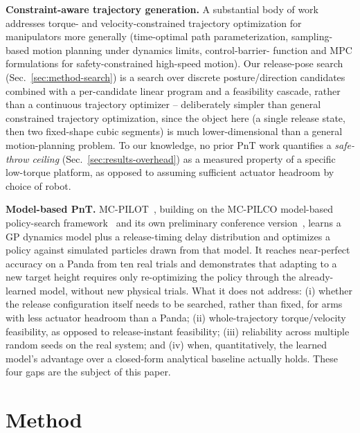 \documentclass[conference]{IEEEtran}
\begin{document}
\textbf{Constraint-aware trajectory generation.} A substantial body of
work addresses torque- and velocity-constrained trajectory optimization
for manipulators more generally (time-optimal path parameterization,
sampling-based motion planning under dynamics limits, control-barrier-
function and MPC formulations for safety-constrained high-speed motion).
Our release-pose search (Sec.~\ref{sec:method-search}) is a search over
discrete posture/direction candidates combined with a per-candidate linear
program and a feasibility cascade, rather than a continuous trajectory
optimizer -- deliberately simpler than general constrained trajectory
optimization, since the object here (a single release state, then two
fixed-shape cubic segments) is much lower-dimensional than a general
motion-planning problem. To our knowledge, no prior PnT work quantifies a
\emph{safe-throw ceiling} (Sec.~\ref{sec:results-overhead}) as a measured
property of a specific low-torque platform, as opposed to assuming
sufficient actuator headroom by choice of robot.

\textbf{Model-based PnT.} MC-PILOT~\cite{turcato2025mcpilot}, building on
the MC-PILCO model-based policy-search framework~\cite{amadio2022mcpilco}
and its own preliminary conference version~\cite{turcato2023codit}, learns
a GP dynamics model plus a release-timing delay distribution and optimizes
a policy against simulated particles drawn from that model. It reaches
near-perfect accuracy on a Panda from ten real trials and demonstrates that
adapting to a new target height requires only re-optimizing the policy
through the already-learned model, without new physical trials. What it
does not address: (i) whether the release configuration itself needs to be
searched, rather than fixed, for arms with less actuator headroom than a
Panda; (ii) whole-trajectory torque/velocity feasibility, as opposed to
release-instant feasibility; (iii) reliability across multiple random
seeds on the real system; and (iv) when, quantitatively, the learned model's
advantage over a closed-form analytical baseline actually holds. These four
gaps are the subject of this paper.

\section{Method}
\end{document}
